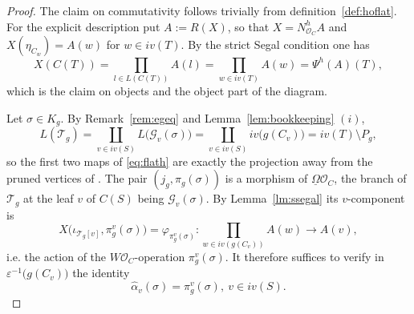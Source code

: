 \documentclass{amsart}
\theoremstyle{definition}
\theoremstyle{remark}
\newcommand{\eps}{\varepsilon}
\begin{document}
	\begin{proof}
		The claim on commutativity follows trivially from definition~\ref{def:hoflat}. 
		For the explicit description put
		$A:=R(X)$, so that $X=N^h_{\mathcal{O}_C}A$ and $X(\eta_{C_w})=A(w)$ for
		$w\in iv(T)$.
		By the strict Segal condition one has
		\[
		X(C(T))=
		\prod_{l\in L(C(T))}A(l)=
		\prod_{w\in iv(T)}A(w)=
		\Psi^{h}(A)(T),
		\] 
		which
		is the claim on objects and the object part of the diagram.
		
		Let $\sigma\in K_g$. By Remark~\ref{rem:egeq} and Lemma~\ref{lem:bookkeeping} $(i)$,
		\[
		L(\mathcal{T}_g)=
		\coprod_{v\in iv(S)} L\bigl(\mathcal{G}_v(\sigma)\bigr)=
		\coprod_{v\in iv(S)} iv\bigl(g(C_v)\bigr)= iv(T)\setminus P_{g},
		\]
		so the first two maps of \eqref{eq:flath} are exactly the projection away
		from the pruned vertices of \cite[(B.1)]{clrrw-22}. The pair
		$(j_g,\pi_g(\sigma))$ is a morphism of $\underline{\Omega}{\mathcal{O}_C}$, the branch of $\mathcal{T}_g$
		at the leaf $v$ of $C(S)$ being $\mathcal{G}_v(\sigma)$.
		By Lemma~\ref{lm:ssegal}
		its $v$-component is
		\[
		X\bigl(\iota_{\mathcal{T}_{g}[v]},\pi^v_g(\sigma)\bigr)=
		\varphi_{\pi^v_g(\sigma)}\colon
		\prod_{w\in iv(g(C_v))}A(w)\rightarrow A(v),
		\]
		i.e. the action of the $W\mathcal{O}_C$-operation $\pi^v_g(\sigma)$.
		It therefore suffices to verify in $\eps^{-1}\bigl(g(C_v)\bigr)$ the identity
		\begin{equation}\label{eq:opstar}
			\widehat{\alpha}_v(\sigma)=
			\pi^v_g(\sigma),\ 
			v\in iv(S).
		\end{equation}
	

\end{proof}
\end{document}
